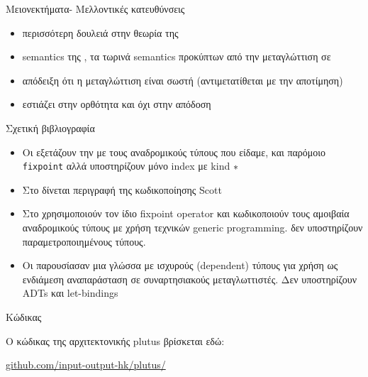\documentclass[10pt]{beamer}
\begin{document}
\begin{frame}{Μειονεκτήματα- Μελλοντικές κατευθύνσεις}

\begin{itemize}
    \item περισσότερη δουλειά στην θεωρία της \FIR{}
    \item semantics της \FIR{}, τα τωρινά semantics προκύπτων από
    την μεταγλώττιση σε \FOMF
    \item απόδειξη ότι η μεταγλώττιση είναι σωστή (αντιμετατίθεται
    με την αποτίμηση)
    \item εστιάζει στην ορθότητα και όχι στην απόδοση
\end{itemize}

\end{frame}

\begin{frame}{Σχετική βιβλιογραφία}

\begin{itemize}
\item<1->
Οι \citep*{BrownP17} εξετάζουν την \FOM με τους αναδρομικούς τύπους
που είδαμε, και παρόμοιο  \texttt{fixpoint} αλλά υποστηρίζουν μόνο
index με kind $\operatorname{\ast}$

\item<2-> Στο \citep{scottenc} δίνεται περιγραφή της κωδικοποίησης Scott

\item<3->
Στο \citep{fixmutualgeneric} χρησιμοποιούν τον ίδιο fixpoint operator
και κωδικοποιούν τους αμοιβαία αναδρομικούς τύπους με χρήση τεχνικών
generic programming. δεν υποστηρίζουν παραμετροποιημένους τύπους.

\item<4->
Οι \citep*{henk} παρουσίασαν μια γλώσσα με ισχυρούς (dependent) τύπους
για χρήση ως ενδιάμεση αναπαράσταση σε συναρτησιακούς μεταγλωττιστές. Δεν
υποστηρίζουν ADTs και let-bindings

\end{itemize}

\end{frame}


\begin{frame}{Κώδικας}

Ο κώδικας της αρχιτεκτονικής plutus βρίσκεται εδώ:

  \begin{center}\url{github.com/input-output-hk/plutus/}\end{center}


\end{frame}
\end{document}
